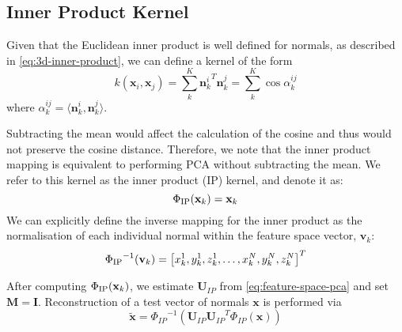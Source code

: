 \subsection{Inner Product Kernel}\label{subsec:sing_img_ip_kernel}
Given that the Euclidean inner product is well defined for normals, as 
described in \cref{eq:3d-inner-product}, we can define a kernel of the form
\begin{equation}\label{eq:ip-cosine-kernel}
    k(\mathbf{x}_i, \mathbf{x}_j) = \sum^K_k {\mathbf{n}_k^i}^T \mathbf{n}_k^j = \sum^K_k \cos \alpha^{ij}_k
\end{equation}
where $\alpha^{ij}_k = \langle \mathbf{n}^i_k, \mathbf{n}^j_k \rangle$.

Subtracting the mean would affect the calculation of the cosine and thus would 
not preserve the cosine distance. Therefore, we note that the inner product 
mapping is equivalent to performing PCA without subtracting the mean. We refer 
to this kernel as the inner product (IP) kernel, and denote it as:
\begin{equation}\label{eq:ip-kernel}
    \Phi_{\operatorname{IP}} (\boldsymbol{\mathbf{x}}_k) = \mathbf{x}_k
\end{equation}
We can explicitly define the inverse mapping for the inner product as the 
normalisation of each individual normal within the feature space vector,
 $\mathbf{v}_k$:
\begin{equation}\label{eq:inv-ip-kernel}
    {\Phi_{\operatorname{IP}}}^{-1} (\boldsymbol{\mathbf{v}}_k) = \left[ x_k^1, y_k^1, z_k^1, \ldots, x_k^N, y_k^N, z_k^N \right]^T
\end{equation}

After computing $\Phi_{\operatorname{IP}} (\boldsymbol{\mathbf{x}}_k)$, we estimate $\mathbf{U}_{IP}$ from 
\cref{eq:feature-space-pca} and set $\mathbf{M} = \mathbf{I}$. 
Reconstruction of a test vector of normals $\mathbf{x}$ is performed via
\begin{equation}\label{eq:ip-reconstruction}
   \tilde{\mathbf{x}} = {\Phi_{IP}}^{-1} \left( \mathbf{U}_{IP} {\mathbf{U}_{IP}}^T \Phi_{IP}(\mathbf{x}) \right)
\end{equation}
